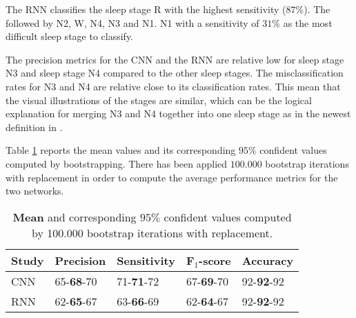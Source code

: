 The RNN classifies the sleep stage R with the highest sensitivity ($87\%$). The followed by N2, W, N4, N3 and N1. N1 with a sensitivity of $31\%$ as the most difficult sleep stage to classify.

The precision metrics for the CNN and the RNN are relative low for sleep stage N3 and sleep stage N4 compared to the other sleep stages. The misclassification rates for N3 and N4 are relative close to its classification rates. This mean that the visual illustrations of the stages are similar, which can be the logical explanation for merging N3 and N4 together into one sleep stage as in the newest definition in \cite{AASM}.



Table \ref{tab_res_2} reports the mean values and its corresponding $95\%$ confident values computed by bootstrapping. There has been applied $100.000$ bootstrap iterations with replacement in order to compute the average performance metrics for the two networks.

\begin{table}[th!]
\centering
\begin{tabular}{l | llll}
Study & Precision & Sensitivity & F$_1$-score & Accuracy \\\hline
CNN               & 65-\textbf{68}-70 & 71-\textbf{71}-72 & 67-\textbf{69}-70 & 92-\textbf{92}-92\\
RNN               & 62-\textbf{65}-67 & 63-\textbf{66}-69 & 62-\textbf{64}-67 & 92-\textbf{92}-92
\end{tabular}
\caption{\textbf{Mean} and corresponding $95\%$ confident values computed by 100.000 bootstrap iterations with replacement.}
\label{tab_res_2}
\end{table}

